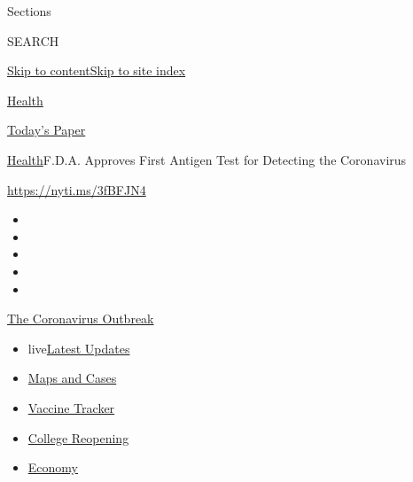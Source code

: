 Sections

SEARCH

\protect\hyperlink{site-content}{Skip to
content}\protect\hyperlink{site-index}{Skip to site index}

\href{https://www.nytimes3xbfgragh.onion/section/health}{Health}

\href{https://myaccount.nytimes3xbfgragh.onion/auth/login?response_type=cookie\&client_id=vi}{}

\href{https://www.nytimes3xbfgragh.onion/section/todayspaper}{Today's
Paper}

\href{/section/health}{Health}\textbar{}F.D.A. Approves First Antigen
Test for Detecting the Coronavirus

\url{https://nyti.ms/3fBFJN4}

\begin{itemize}
\item
\item
\item
\item
\item
\end{itemize}

\href{https://www.nytimes3xbfgragh.onion/news-event/coronavirus?action=click\&pgtype=Article\&state=default\&region=TOP_BANNER\&context=storylines_menu}{The
Coronavirus Outbreak}

\begin{itemize}
\tightlist
\item
  live\href{https://www.nytimes3xbfgragh.onion/2020/08/04/world/coronavirus-cases.html?action=click\&pgtype=Article\&state=default\&region=TOP_BANNER\&context=storylines_menu}{Latest
  Updates}
\item
  \href{https://www.nytimes3xbfgragh.onion/interactive/2020/us/coronavirus-us-cases.html?action=click\&pgtype=Article\&state=default\&region=TOP_BANNER\&context=storylines_menu}{Maps
  and Cases}
\item
  \href{https://www.nytimes3xbfgragh.onion/interactive/2020/science/coronavirus-vaccine-tracker.html?action=click\&pgtype=Article\&state=default\&region=TOP_BANNER\&context=storylines_menu}{Vaccine
  Tracker}
\item
  \href{https://www.nytimes3xbfgragh.onion/2020/08/02/us/covid-college-reopening.html?action=click\&pgtype=Article\&state=default\&region=TOP_BANNER\&context=storylines_menu}{College
  Reopening}
\item
  \href{https://www.nytimes3xbfgragh.onion/live/2020/08/04/business/stock-market-today-coronavirus?action=click\&pgtype=Article\&state=default\&region=TOP_BANNER\&context=storylines_menu}{Economy}
\end{itemize}

